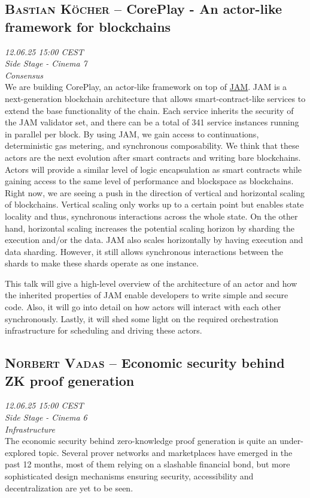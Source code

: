 \clearpage
\subsection {\textsc{Bastian Köcher}  -- CorePlay - An actor-like framework for blockchains} \noindent \textit {12.06.25 15:00 CEST\\ Side Stage - Cinema 7\\ Consensus}\\[1em] We are building CorePlay, an actor-like framework on top of \href{https://graypaper.com/}{JAM}. JAM is a next-generation blockchain architecture that allows smart-contract-like services to extend the base functionality of the chain. Each service inherits the security of the JAM validator set, and there can be a total of 341 service instances running in parallel per block. By using JAM, we gain access to continuations, deterministic gas metering, and synchronous composability. We think that these actors are the next evolution after smart contracts and writing bare blockchains. Actors will provide a similar level of logic encapsulation as smart contracts while gaining access to the same level of performance and blockspace as blockchains. Right now, we are seeing a push in the direction of vertical and horizontal scaling of blockchains. Vertical scaling only works up to a certain point but enables state locality and thus, synchronous interactions across the whole state. On the other hand, horizontal scaling increases the potential scaling horizon by sharding the execution and/or the data. JAM also scales horizontally by having execution and data sharding. However, it still allows synchronous interactions between the shards to make these shards operate as one instance.

This talk will give a high-level overview of the architecture of an actor and how the inherited properties of JAM enable developers to write simple and secure code. Also, it will go into detail on how actors will interact with each other synchronously.\newline
Lastly, it will shed some light on the required orchestration infrastructure for scheduling and driving these actors.

\clearpage
\subsection {\textsc{Norbert Vadas}  -- Economic security behind ZK proof generation} \noindent \textit {12.06.25 15:00 CEST\\ Side Stage - Cinema 6\\ Infrastructure}\\[1em] The economic security behind zero-knowledge proof generation is quite an under-explored topic. Several prover networks and marketplaces have emerged in the past 12 months, most of them relying on a slashable financial bond, but more sophisticated design mechanisms ensuring security, accessibility and decentralization are yet to be seen.

